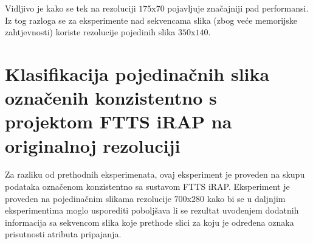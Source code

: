 \documentclass[times, utf8, diplomski, numeric]{fer}
\begin{document}
Vidljivo je kako se tek na rezoluciji $175$x$70$ pojavljuje značajniji pad performansi. 
Iz tog razloga se za eksperimente nad sekvencama slika (zbog veće memorijske zahtjevnosti) koriste rezolucije pojedinih slika $350$x$140$.

\section{Klasifikacija pojedinačnih slika označenih konzistentno s projektom FTTS iRAP na originalnoj rezoluciji}
Za razliku od prethodnih eksperimenata, ovaj eksperiment je proveden na skupu podataka označenom konzistentno sa sustavom FTTS iRAP.
Eksperiment je proveden na pojedinačnim slikama rezolucije $700$x$280$ kako bi se u daljnjim eksperimentima moglo usporediti poboljšava li se rezultat uvođenjem dodatnih informacija sa sekvencom slika koje prethode slici za koju je određena oznaka prisutnosti atributa pripajanja.
\end{document}
